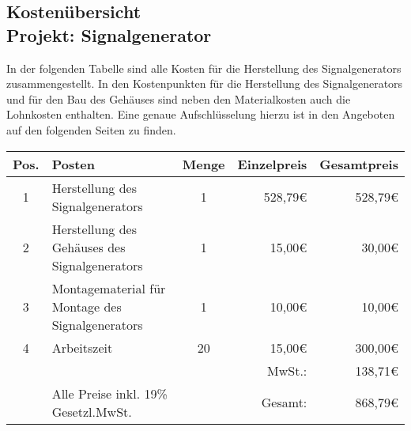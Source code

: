 \begin{center}
\section*{Kostenübersicht \\ Projekt: Signalgenerator}
\end{center}
In der folgenden Tabelle sind alle Kosten für die Herstellung des Signalgenerators zusammengestellt. In den Kostenpunkten für die Herstellung des Signalgenerators und für den Bau des Gehäuses sind neben den Materialkosten auch die Lohnkosten enthalten. Eine genaue Aufschlüsselung hierzu ist in den Angeboten auf den folgenden Seiten zu finden.
\bigskip
\begin{center}

\begin{tabular}{cp{7cm}cr|r|}
\hline
\multicolumn{1}{|l|}{Pos.} & \multicolumn{1}{l|}{Posten} & \multicolumn{1}{l|}{Menge} & Einzelpreis & Gesamtpreis \\ \hline
\multicolumn{1}{|c|}{1} & \multicolumn{1}{l|}{Herstellung des Signalgenerators} & \multicolumn{1}{c|}{1} & 528,79\euro & 528,79\euro \\ \hline
\multicolumn{1}{|c|}{2} & \multicolumn{1}{l|}{Herstellung des Gehäuses des Signalgenerators} & \multicolumn{1}{c|}{1} & 15,00\euro & 30,00\euro \\ \hline
\multicolumn{1}{|c|}{3} & \multicolumn{1}{l|}{Montagematerial für Montage des Signalgenerators} & \multicolumn{1}{c|}{1} & 10,00\euro & 10,00\euro \\ \hline
\multicolumn{1}{|c|}{4} & \multicolumn{1}{l|}{Arbeitszeit} & \multicolumn{1}{c|}{20} & 15,00\euro & 300,00\euro \\ \hline
 & & & MwSt.: & 138,71\euro \\ \cline{5-5}
                        & Alle Preise inkl. 19\% Gesetzl.MwSt. &                       & Gesamt: & 868,79\euro \\ \cline{5-5} 
\end{tabular}

\end{center}



